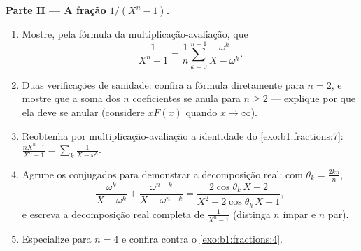 \begin{problem}
\medskip
\noindent\textbf{Parte II --- A fração $1/(X^n - 1)$.}
\begin{enumerate}
  \item Mostre, pela fórmula da multiplicação-avaliação, que
        \[
        \frac{1}{X^n - 1}
        = \frac1n\sum_{k=0}^{n-1}\frac{\omega^k}{X - \omega^k} .
        \]
  \item Duas verificações de sanidade: confira a fórmula diretamente para
        $n =
        2$, e mostre que a soma dos $n$ coeficientes
        se anula para $n \geq 2$ --- explique por que ela deve se anular
        (considere $xF(x)$ quando $x \to \infty$).
  \item Reobtenha por multiplicação-avaliação a identidade do
        \cref{exo:b1:fractions:7}:
        $\frac{nX^{n-1}}{X^n-1} = \sum_k \frac1{X - \omega^k}$.
  \item Agrupe os  conjugados para demonstrar a decomposição real:
        com $\theta_k = \frac{2k\pi}n$,
        \[
        \frac{\omega^k}{X - \omega^k} +
        \frac{\omega^{n-k}}{X - \omega^{n-k}}
        = \frac{2\cos\theta_k\,X - 2}
        {X^2 - 2\cos\theta_k\,X + 1} ,
        \]
        e escreva a decomposição real completa de
        $\frac1{X^n-1}$ (distinga $n$ ímpar e $n$ par).
  \item Especialize para $n = 4$ e confira contra o
        \cref{exo:b1:fractions:4}.
\end{enumerate}


\end{problem}
